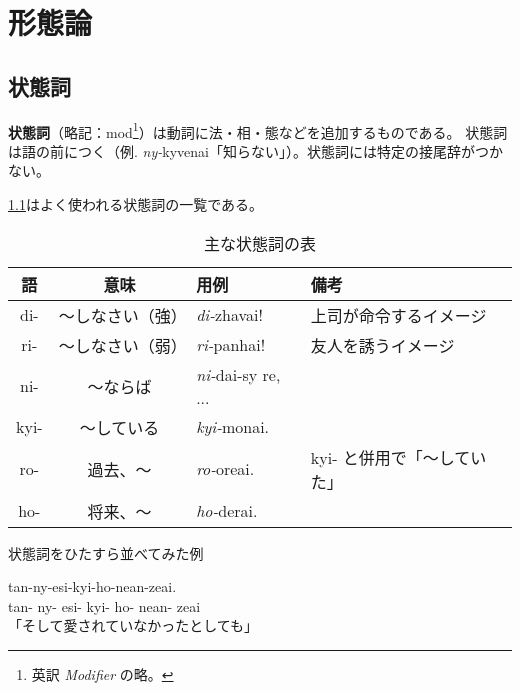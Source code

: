 \chapter{形態論}

\section{状態詞}

\textbf{状態詞}（略記：mod\footnote{英訳 \emph{Modifier} の略。}）は動詞に法・相・態などを追加するものである。
状態詞は語の前につく（例. \emph{ny-}kyvenai「知らない」）。状態詞には特定の接尾辞がつかない。

\cref{table:common-mods}はよく使われる状態詞の一覧である。

\begin{table}[H]
    \centering
    \caption{主な状態詞の表}
    \label{table:common-mods}
    \begin{tabular}{ccll}
        \toprule
        語 & 意味 & 用例 & 備考 \\
        \midrule
        di-  & ～しなさい（強） & \emph{di-}zhavai! & 上司が命令するイメージ \\
        ri-  & ～しなさい（弱） & \emph{ri-}panhai! & 友人を誘うイメージ\\
        ni-  & ～ならば   & \emph{ni-}dai-sy re, ...& \\
        kyi- & ～している & \emph{kyi-}monai. & \\
        ro-  & 過去、～   & \emph{ro-}oreai. & kyi- と併用で「～していた」\\
        ho-  & 将来、～   & \emph{ho-}derai. & \\
        \bottomrule
    \end{tabular}
\end{table}

\begin{itembox}[l]{状態詞をひたすら並べてみた例}
    \begin{pindent}
        tan-ny-esi-kyi-ho-nean-zeai. \\
        tan-
        ny-
        esi-
        kyi-
        ho-
        nean-
        zeai \\
        「そして愛されていなかったとしても」
    \end{pindent}
\end{itembox}

